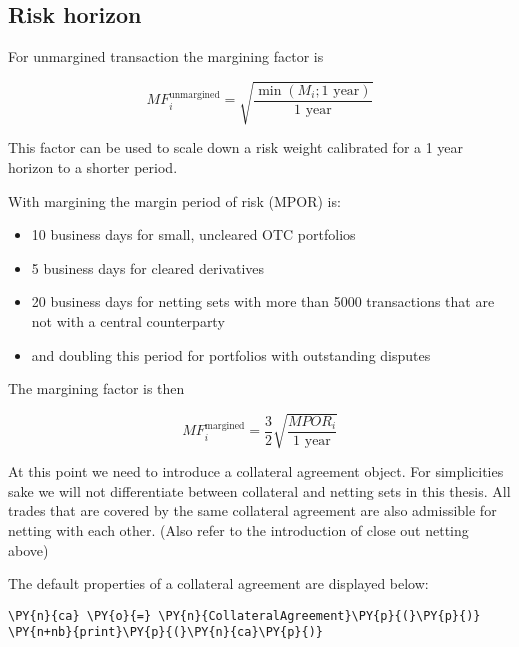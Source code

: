     \hypertarget{risk-horizon}{%
\subsection{Risk horizon}\label{risk-horizon}}

For unmargined transaction the margining factor is

\[MF^{\text{unmargined}}_i = \sqrt{\frac{\min\left(M_i;1\text{ year}\right)}{1\text{ year}}}\]

This factor can be used to scale down a risk weight calibrated for a 1
year horizon to a shorter period.

With margining the margin period of risk (MPOR) is:

\begin{itemize}
\tightlist
\item
  10 business days for small, uncleared OTC portfolios
\item
  5 business days for cleared derivatives
\item
  20 business days for netting sets with more than 5000 transactions
  that are not with a central counterparty
\item
  and doubling this period for portfolios with outstanding disputes
\end{itemize}

The margining factor is then

\[ MF^{\text{margined}}_i = \frac{3}{2}\sqrt{\frac{MPOR_i}{1\text{ year}}} \]

    At this point we need to introduce a collateral agreement object. For
simplicities sake we will not differentiate between collateral and
netting sets in this thesis. All trades that are covered by the same
collateral agreement are also admissible for netting with each other.
(Also refer to the introduction of close out netting above)

The default properties of a collateral agreement are displayed below:

    \begin{tcolorbox}[breakable, size=fbox, boxrule=1pt, pad at break*=1mm,colback=cellbackground, colframe=cellborder]
\begin{Verbatim}[commandchars=\\\{\}]
\PY{n}{ca} \PY{o}{=} \PY{n}{CollateralAgreement}\PY{p}{(}\PY{p}{)}
\PY{n+nb}{print}\PY{p}{(}\PY{n}{ca}\PY{p}{)}
\end{Verbatim}
\end{tcolorbox}

